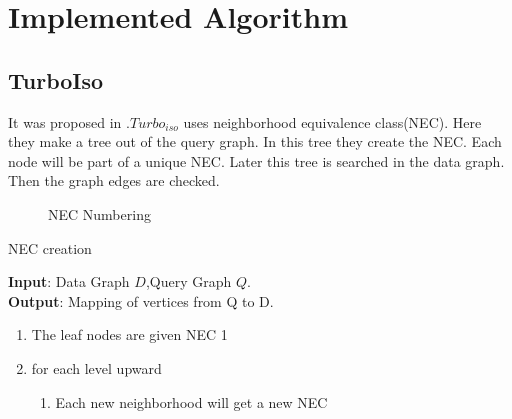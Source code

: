 \section{Implemented Algorithm}
\label{sec:implementation}
\subsection{TurboIso}
\label{sec:tiso}
	\hspace{10mm}It was proposed in \cite{Turbosio}.$Turbo_{iso}$ uses neighborhood equivalence class(NEC). Here they make a tree out of the query graph. In this tree they create the NEC. Each node will be part of a unique NEC. Later this tree is searched in the data graph. Then the graph edges are checked.
	
	\begin{figure}[h]
 \centering
{}

 \caption{NEC Numbering}
\end{figure}


\begin{algorithm}[H]
\caption{NEC creation}
\textbf{Input}: Data Graph $D$,Query Graph $Q$.\\
\textbf{Output}: Mapping of vertices from Q to D.\\
\begin{algorithmic}
\item \begin{enumerate}
\item The leaf nodes are given NEC 1
\item for each level upward
\begin{enumerate}
\item Each new neighborhood will get a new NEC
\end{enumerate}
\end{enumerate}
\end{algorithmic}
\end{algorithm}


